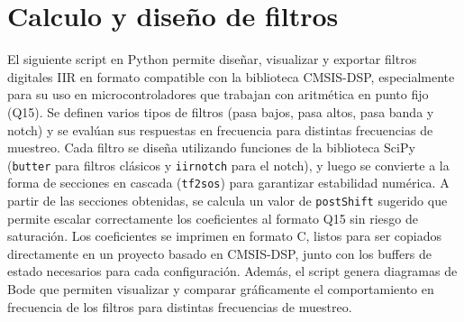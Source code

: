 \documentclass[12pt]{article}
\begin{document}
	\section{Calculo y diseño de filtros}
	El siguiente script en Python permite diseñar, visualizar y exportar filtros digitales IIR en formato compatible con la biblioteca CMSIS-DSP, especialmente para su uso en microcontroladores que trabajan con aritmética en punto fijo (Q15). Se definen varios tipos de filtros (pasa bajos, pasa altos, pasa banda y notch) y se evalúan sus respuestas en frecuencia para distintas frecuencias de muestreo. Cada filtro se diseña utilizando funciones de la biblioteca SciPy (\texttt{butter} para filtros clásicos y \texttt{iirnotch} para el notch), y luego se convierte a la forma de secciones en cascada (\texttt{tf2sos}) para garantizar estabilidad numérica. A partir de las secciones obtenidas, se calcula un valor de \texttt{postShift} sugerido que permite escalar correctamente los coeficientes al formato Q15 sin riesgo de saturación. Los coeficientes se imprimen en formato C, listos para ser copiados directamente en un proyecto basado en CMSIS-DSP, junto con los buffers de estado necesarios para cada configuración. Además, el script genera diagramas de Bode que permiten visualizar y comparar gráficamente el comportamiento en frecuencia de los filtros para distintas frecuencias de muestreo.
	
\end{document}
